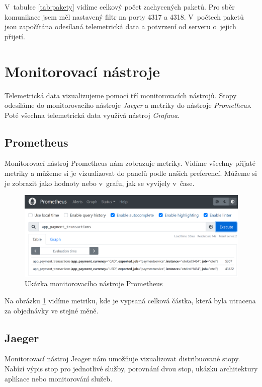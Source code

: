 V~tabulce \ref{tab:pakety} vidíme celkový počet zachycených paketů. Pro sběr komunikace jsem měl nastavený filtr na porty 4317 a 4318. V~počtech paketů jsou započítána odesílaná telemetrická data a potvrzení od serveru o~jejich přijetí.



\section{Monitorovací nástroje}
Telemetrická data vizualizujeme pomocí tří monitorovacích nástrojů. Stopy odesíláme do monitorovacího nástroje \textit{Jaeger} a metriky do nástroje \textit{Prometheus}. Poté všechna telemetrická data využívá nástroj \textit{Grafana}.

\subsection{Prometheus}
Monitorovací nástroj Prometheus nám zobrazuje metriky. Vidíme všechny přijaté metriky a můžeme si je vizualizovat do panelů podle našich preferencí. Můžeme si je zobrazit jako hodnoty nebo v~grafu,  jak se vyvíjely v~čase. 

\begin{figure}[H]
  \centering
  \includegraphics[width=15cm]{obrazky-figures/prometheusTable.png}
  \caption{Ukázka monitorovacího nástroje Prometheus}
  \label{fig:prometheusTable}
\end{figure}

Na obrázku \ref{fig:prometheusTable} vidíme metriku, kde je vypsaná celková částka, která byla utracena za objednávky ve stejné měně.

\subsection{Jaeger}
Monitorovací nástroj Jeager nám umožňuje vizualizovat distribuované stopy. Nabízí výpis stop pro jednotlivé služby, porovnání dvou stop, ukázku architektury aplikace nebo monitorování služeb. 

